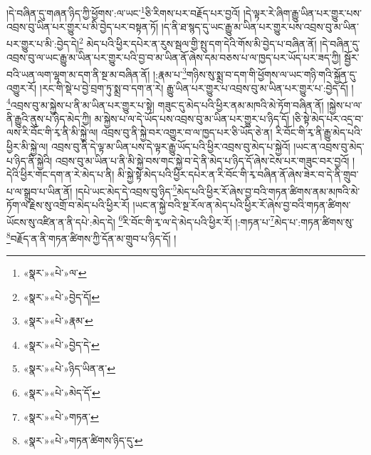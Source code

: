 །དེ་བཞིན་དུ་གཞན་ཉིད་ཀྱི་ཕྱོགས་:ལ་ཡང་\footnote{«སྣར་»«པེ་»ལ་}ཅི་རིགས་པར་བརྗོད་པར་བྱའོ། །དེ་ལྟར་རེ་ཞིག་རྒྱུ་ཡིན་པར་གྱུར་པས་འབྲས་བུ་ཡིན་པར་གྱུར་པ་མི་བྱེད་པར་བསྟན་ཏོ། །ད་ནི་ཐ་སྙད་དུ་ཡང་རྒྱུ་མ་ཡིན་པར་གྱུར་པས་འབྲས་བུ་མ་ཡིན་པར་གྱུར་པ་མི་:བྱེད་དེ།\footnote{«སྣར་»«པེ་»བྱེད་དོ།} མེད་པའི་ཕྱིར་དཔེར་ན་རུས་སྦལ་གྱི་སྤུ་དག་དེའི་གོས་མི་བྱེད་པ་བཞིན་ནོ། །དེ་བཞིན་དུ་འབྲས་བུ་ལ་ཡང་རྒྱུ་མ་ཡིན་པར་གྱུར་པའི་བྱ་བ་མ་ཡིན་ནོ་ཞེས་དམ་བཅས་པ་ལ་ཁྱད་པར་ཡོད་པར་ཟད་ཀྱི། སྦྱོར་བའི་ཡན་ལག་ལྷག་མ་དག་ནི་སྔ་མ་བཞིན་ནོ། །:རྣམ་པ་\footnote{«སྣར་»«པེ་»རྣམ་}གཉིས་སུ་སྨྲ་བ་དག་གི་ཕྱོགས་ལ་ཡང་གཉི་གའི་སྐྱོན་དུ་འགྱུར་རོ། །རང་གི་སྡེ་པ་བྱེ་བྲག་ཏུ་སྨྲ་བ་དག་ན་རེ། རྒྱུ་ཡིན་པར་གྱུར་པ་འབྲས་བུ་མ་ཡིན་པར་གྱུར་པ་:བྱེད་དོ། །\footnote{«སྣར་»«པེ་»བྱེད་དེ་}འབྲས་བུ་མ་སྐྱེས་པ་ནི་མ་ཡིན་པར་གྱུར་པ་སྟེ། གཟུང་དུ་མེད་པའི་ཕྱིར་ནམ་མཁའི་མེ་ཏོག་བཞིན་ནོ། །སྐྱེས་པ་ལ་ནི་རྒྱུའི་ནུས་པ་ཉིད་མེད་ཀྱི། མ་སྐྱེས་པ་ལ་དེ་ཡོད་པས་འབྲས་བུ་མ་ཡིན་པར་གྱུར་པ་ཉིད་དོ། །ཅི་སྟེ་མེད་པར་འདྲ་བ་ལས་རི་བོང་གི་རྭ་ནི་མི་སྐྱེ་ལ། འབྲས་བུ་ནི་སྐྱེ་བར་འགྱུར་བ་ལ་ཁྱད་པར་ཅི་ཡོད་ཅེ་ན། རི་བོང་གི་རྭ་ནི་རྒྱུ་མེད་པའི་ཕྱིར་མི་སྐྱེ་ལ། འབྲས་བུ་ནི་དེ་ལྟ་མ་ཡིན་པས་དེ་ལྟར་རྒྱུ་ཡོད་པའི་ཕྱིར་འབྲས་བུ་མེད་པ་སྐྱེའོ། །ཡང་ན་འབྲས་བུ་མེད་པ་ཉིད་ནི་སྐྱེའི། འབྲས་བུ་མ་ཡིན་པ་ནི་མི་སྐྱེ་བས་གང་སྐྱེ་བ་དེ་ནི་མེད་པ་ཉིད་དོ་ཞེས་ངེས་པར་གཟུང་བར་བྱའོ། །དེའི་ཕྱིར་གང་དག་ན་རེ་མེད་པ་ནི། མི་སྐྱེ་སྟེ་མེད་པའི་ཕྱིར་དཔེར་ན་རི་བོང་གི་རྭ་བཞིན་ནོ་ཞེས་ཟེར་བ་དེ་ནི་གྲུབ་པ་ལ་སྒྲུབ་པ་ཡིན་ནོ། །དཔེ་ཡང་མེད་དེ་འབྲས་བུ་ཉིད་\footnote{«སྣར་»«པེ་»ཉིད་ཡིན་ན་}མེད་པའི་ཕྱིར་རོ་ཞེས་བྱ་བའི་གཏན་ཚིགས་ནམ་མཁའི་མེ་ཏོག་ལ་རྗེས་སུ་འགྲོ་བ་མེད་པའི་ཕྱིར་རོ། །ཡང་ན་སྐྱེ་བའི་སྔ་རོལ་ན་མེད་པའི་ཕྱིར་རོ་ཞེས་བྱ་བའི་གཏན་ཚིགས་ཡོངས་སུ་འཛིན་ན་ནི་དཔེ་:མེད་དེ། \footnote{«སྣར་»«པེ་»མེད་དོ་}རི་བོང་གི་རྭ་ལ་དེ་མེད་པའི་ཕྱིར་རོ། །:གཏན་པ་\footnote{«སྣར་»«པེ་»གཏན་}མེད་པ་:གཏན་ཚིགས་སུ་\footnote{«སྣར་»«པེ་»གཏན་ཚིགས་ཉིད་དུ་}བརྗོད་ན་ནི་གཏན་ཚིགས་ཀྱི་དོན་མ་གྲུབ་པ་ཉིད་དོ། །

